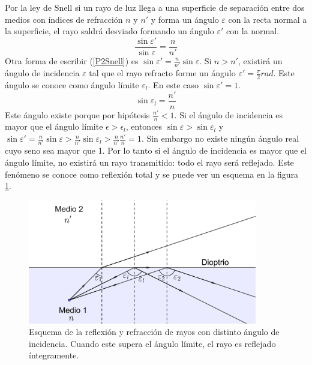 \documentclass[12pt]{article}
\numberwithin{table}{section}
\numberwithin{figure}{section}
\numberwithin{equation}{section}
\DeclareMathOperator{\sen}{sin}
\begin{document}
Por la ley de Snell si un rayo de luz llega a una superficie de separación entre dos medios con índices de refracción $n$ y $n'$ y forma un ángulo $\varepsilon$ con la recta normal a la superficie, el rayo saldrá desviado formando un ángulo $\varepsilon'$ con la normal.
\begin{equation}\label{P2Snell}
	\frac{\sen\varepsilon'}{\sen\varepsilon}=\frac{n}{n'}
\end{equation}
Otra forma de escribir (\ref{P2Snell}) es $\sen\varepsilon'=\frac{n}{n'}\sen\varepsilon$. Si $n>n'$, existirá un ángulo de incidencia $\varepsilon$ tal que el rayo refracto forme un ángulo $\varepsilon'= {\frac{\pi}{2}}\si{rad}$. Este ángulo se conoce como ángulo límite $\varepsilon_l$. En este caso $\sen\varepsilon'=1$.
\begin{equation}\label{P2eqangulolimite}
	\sen\varepsilon_l=\frac{n'}{n}
\end{equation}
Este ángulo existe porque por hipótesis $\frac{n'}{n}<1$. Si el ángulo de incidencia es mayor que el ángulo límite $\epsilon>\epsilon_l$, entonces $\sen\varepsilon>\sen\varepsilon_l$ y $\sen\varepsilon'=\frac{n}{n'}\sen\varepsilon>\frac{n}{n'}\sen\varepsilon_l>\frac{n}{n'}\frac{n'}{n}=1$. Sin embargo no existe ningún ángulo real cuyo seno sea mayor que 1. Por lo tanto si el ángulo de incidencia es mayor que el ángulo límite, no existirá un rayo transmitido: todo el rayo será reflejado. Este fenómeno se conoce como reflexión total y se puede ver un esquema en la figura \ref{P2figangulolimite}.

\begin{figure}[!ht]
	\small \centering \sffamily
	\begin{center}
		\includegraphics[width=10cm]{P2Angulolimite.png}
		\caption{Esquema de la reflexión y refracción de rayos con distinto ángulo de incidencia. Cuando este supera el ángulo límite, el rayo es reflejado íntegramente.}
		\label{P2figangulolimite}
	\end{center}
\end{figure}
\end{document}
